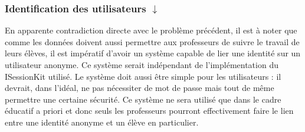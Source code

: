 \subsubsection[Identification des utilisateurs]{Identification des utilisateurs \hyperref[identifSol]{$\downarrow$}}
\label{identifPb}

En apparente contradiction directe avec le problème précédent, il est à noter que comme les données doivent aussi permettre aux professeurs de suivre le travail de leurs élèves, il est impératif d'avoir un système capable de lier une identité sur un utilisateur anonyme. Ce système serait indépendant de l'implémentation du ISessionKit utilisé. Le système doit aussi être simple pour les utilisateurs : il devrait, dans l'idéal, ne pas nécessiter de mot de passe mais tout de même permettre une certaine sécurité. Ce système ne sera utilisé que dans le cadre éducatif a priori et donc seuls les professeurs pourront effectivement faire le lien entre une identité anonyme et un élève en particulier.


